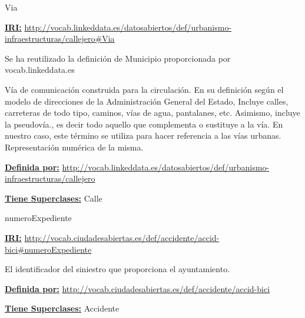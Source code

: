 \begin{mybox}{Via}
\begin{flushleft}
\underline{\textbf{IRI:}}
\url{http://vocab.linkeddata.es/datosabiertos/def/urbanismo-infraestructuras/callejero#Via}
\newline

Se ha reutilizado la definición de Municipio proporcionada por vocab.linkeddata.es \cite{datoabiertos_idVia}

Vía de comunicación construida para la circulación. En su definición según el modelo de direcciones de la Administración General del Estado, Incluye calles, carreteras de todo tipo, caminos, vías de agua, pantalanes, etc. Asimismo, incluye la pseudovía., es decir todo aquello que complementa o sustituye a la vía. En nuestro caso, este término se utiliza para hacer referencia a las vías urbanas.
Representación numérica de la misma.
\newline

\underline{\textbf{Definida por:}}
\url{http://vocab.linkeddata.es/datosabiertos/def/urbanismo-infraestructuras/callejero}
\newline

\underline{\textbf{Tiene Superclases:}}
\newline Calle





\end{flushleft}
\end{mybox}




\begin{mybox}{numeroExpediente}
\begin{flushleft}
\underline{\textbf{IRI:}}
\url{http://vocab.ciudadesabiertas.es/def/accidente/accid-bici#numeroExpediente}
\newline

El identificador del siniestro que proporciona el ayuntamiento.
\newline

\underline{\textbf{Definida por:}}
\newline \url{http://vocab.ciudadesabiertas.es/def/accidente/accid-bici}
\newline

\underline{\textbf{Tiene Superclases:}}
\newline Accidente
\newline


\end{flushleft}
\end{mybox}


